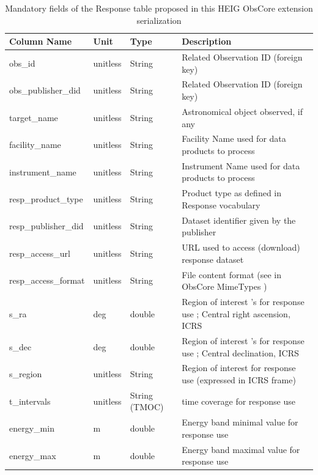 \begin{table}[htbp]
\begin{tabular}{|p{}|p{}|p{}|p{}|}
\hline
Column Name & Unit & Type & Description\\\hline
obs\_id & unitless & String & Related Observation ID (foreign key) \\\hline
obs\_publisher\_did & unitless & String & Related Observation ID (foreign key) \\\hline
target\_name & unitless & String & Astronomical object observed, if any\\\hline
facility\_name & unitless & String & Facility Name used for data products to process  \\\hline
instrument\_name & unitless & String & Instrument Name used for data products to process \\\hline
resp\_product\_type & unitless & String &  Product type as defined in Response vocabulary\\\hline
resp\_publisher\_did & unitless & String & Dataset identifier given by the publisher\\\hline
resp\_access\_url & unitless & String & URL used to access (download) response dataset\\\hline
resp\_access\_format & unitless & String & File content format (see in ObsCore MimeTypes )\\\hline
s\_ra & deg & double & Region of interest 's  for response use ; Central right ascension, ICRS\\\hline
s\_dec & deg & double & Region of interest 's for response use ; Central declination, ICRS\\\hline
s\_region & unitless & String & Region of interest  for response use (expressed in ICRS frame)\\\hline
t\_intervals & unitless& String (TMOC) & time coverage for response use \\\hline
energy\_min & m & double & Energy band minimal value for response use  \\\hline
energy\_max & m & double & Energy band maximal value for response use  \\\hline
\end{tabular}
\caption{Mandatory fields of the Response table proposed in this HEIG ObsCore extension serialization}
\label{tab:response_table}
\end{table}


